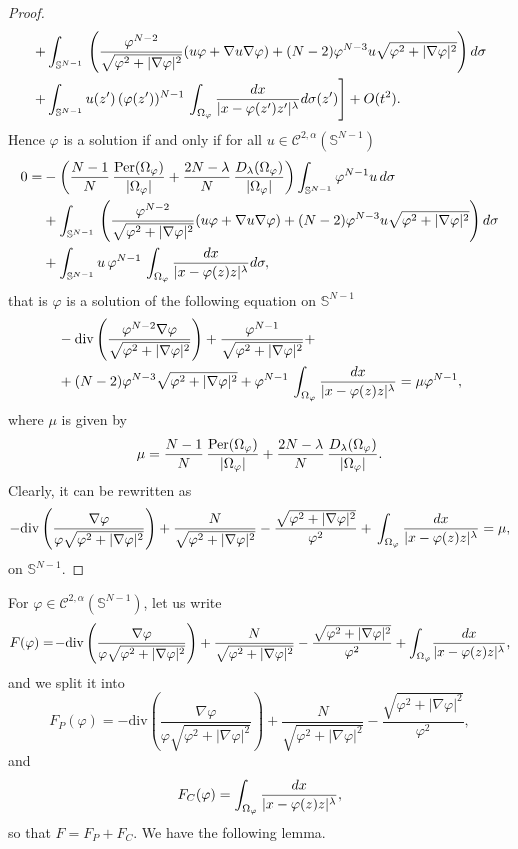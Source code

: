 \documentclass[10pt,reqno,english]{amsart}
\newcommand{\Sn}{\mathbb{S}^{N-1}}
\theoremstyle{definition}
\numberwithin{equation}{section}
\begin{document}
\begin{proof}
\[\begin{aligned}
&\left.
  + \int_{\mathbb S^{N-1}} \, \left( {\varphi^{N-2} \over  \sqrt{ \varphi^2 + |\nabla \varphi|^2}} (u \varphi + \nabla u \nabla \varphi) + (N-2) \varphi^{N-3} u  \sqrt{ \varphi^2 + |\nabla \varphi|^2}\right) d \sigma\right.\\
&\left.+\int_{\mathbb S^{N-1}}  u(z') \, (\varphi (z'))^{N-1} \,  \int_{\Omega_\varphi}    {  d x\over |x - \varphi (z')   z'|^\lambda} d \sigma (z')  \right]+O(t^2).
\end{aligned}
\]
Hence $\varphi$ is a solution if and only if for all $u\in\mathcal C^{2,\alpha}(\Sn)$
\begin{align*}
 0= &-\left( {N-1 \over N} \, {{\mbox {Per}} (\Omega_{\varphi }) \over  |\Omega_\varphi |} +{2N-\lambda \over N} \,\frac{D_\lambda(\Omega_\varphi) }{|\Omega_\varphi |}\right)\int_{\mathbb S^{N-1}} \varphi^{N-1} u \,d\sigma\\
  &+
   \int_{\mathbb S^{N-1}} \, \left( {\varphi^{N-2} \over  \sqrt{ \varphi^2 + |\nabla \varphi|^2}} (u \varphi + \nabla u \nabla \varphi) + (N-2) \varphi^{N-3} u  \sqrt{ \varphi^2 + |\nabla \varphi|^2}\right) d \sigma\\
   &+\int_{\mathbb S^{N-1}}  u\,\varphi^{N-1} \,  \int_{\Omega_\varphi}    {  d x\over |x - \varphi  (z)  z|^\lambda} d \sigma,
\end{align*}
that is $\varphi$ is a solution of the following equation on $\mathbb S^{N-1}$
\[
\begin{split}
    &-\mathrm{div}\left(\frac{\varphi^{N-2}\nabla\varphi}{\sqrt{ \varphi^2 + |\nabla \varphi|^2}}\right)+\frac{\varphi^{N-1}}{\sqrt{ \varphi^2 + |\nabla \varphi|^2}}+\\
    &+(N-2)\varphi^{N-3}\sqrt{ \varphi^2 + |\nabla \varphi|^2}+\varphi^{N-1} \,  \int_{\Omega_\varphi}    {  d x\over |x - \varphi (z)   z|^\lambda}=\mu \varphi^{N-1},
\end{split}
\]
where $\mu$ is given by
\[
\mu= {N-1 \over N} \, {{\mbox {Per}} (\Omega_{\varphi }) \over  |\Omega_\varphi |} +{2N-\lambda \over N} \,\frac{D_\lambda(\Omega_\varphi) }{|\Omega_\varphi |}.
\]
Clearly, it can be rewritten as
\[
-\mathrm{div}\left(\frac{\nabla\varphi}{\varphi\sqrt{ \varphi^2 + |\nabla \varphi|^2}}\right)+\frac{N}{\sqrt{ \varphi^2 + |\nabla \varphi|^2}}-\frac{\sqrt{ \varphi^2 + |\nabla \varphi|^2}}{\varphi^2}+ \,  \int_{\Omega_\varphi}    {  d x\over |x - \varphi (z)   z|^\lambda}=\mu ,
\]
 on $\mathbb S^{N-1}$.
\end{proof}

For $\varphi\in\mathcal C^{2,\alpha}(\Sn)$, let us write
\[
F(\varphi)=\!-\mathrm{div}\left(\frac{\nabla\varphi}{\varphi\sqrt{ \varphi^2 + |\nabla \varphi|^2}}\right)+\frac{N}{\sqrt{ \varphi^2 + |\nabla \varphi|^2}}-\frac{\sqrt{ \varphi^2 + |\nabla \varphi|^2}}{\varphi^2}+ \int_{\Omega_\varphi}    \!{  d x\over |x - \varphi (z)   z|^\lambda},
\]
and  we split it into
\[
F_P(\varphi)=-\mathrm{div}\left(\frac{\nabla\varphi}{\varphi\sqrt{ \varphi^2 + |\nabla \varphi|^2}}\right)+\frac{N}{\sqrt{ \varphi^2 + |\nabla \varphi|^2}}-\frac{\sqrt{ \varphi^2 + |\nabla \varphi|^2}}{\varphi^2},
\]
and
\[
F_C(\varphi)=  \int_{\Omega_\varphi}    {  d x\over |x - \varphi (z)   z|^\lambda},
\]
so that $F=F_P+F_C$.
We have the following lemma.
\end{document}
